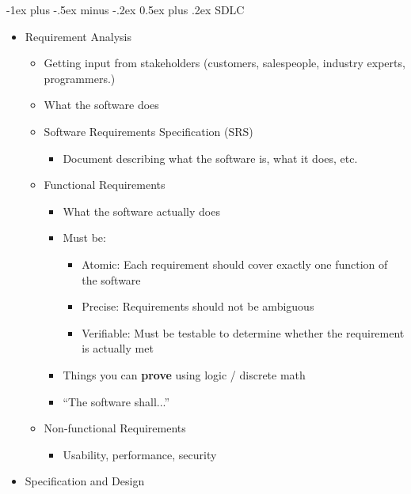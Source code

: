 \documentclass[letterpaper, 8pt]{extarticle}
\makeatletter
\renewcommand{\section}{\@startsection{section}{1}{0mm}%
                                {-1ex plus -.5ex minus -.2ex}%
                                {0.5ex plus .2ex}%
                                {\normalfont\normalsize\bfseries}}
\makeatother
\begin{document}
\begin{multicols*}{6}
  \section{SDLC}
  \begin{itemize}
    \item Requirement Analysis
          \begin{itemize}
            \item Getting input from stakeholders (customers, salespeople, industry experts, programmers.)
            \item What the software does
            \item Software Requirements Specification (SRS)
                  \begin{itemize}
                    \item Document describing what the software is, what it does, etc.
                  \end{itemize}
            \item Functional Requirements
                  \begin{itemize}
                    \item What the software actually does
                    \item Must be:
                          \begin{itemize}
                            \item Atomic: Each requirement should cover exactly one function of the software
                            \item Precise: Requirements should not be ambiguous
                            \item Verifiable: Must be testable to determine whether the requirement is actually met
                          \end{itemize}
                    \item Things you can \textbf{prove} using logic / discrete math
                    \item ``The software shall...''
                  \end{itemize}
            \item Non-functional Requirements
                  \begin{itemize}
                    \item Usability, performance, security
                  \end{itemize}
          \end{itemize}
    \item Specification and Design

\end{itemize}
\end{multicols*}
\end{document}
